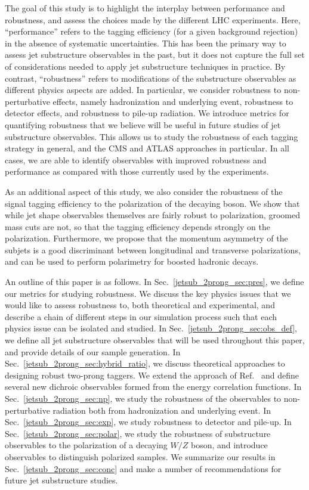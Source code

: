 \documentclass[11pt,letterpaper]{article}
\begin{document}
The goal of this study is to highlight the interplay between performance and robustness, and assess the choices made by the different LHC experiments.
%
Here, ``performance'' refers to the tagging efficiency (for a given background rejection) in the absence of systematic uncertainties.
%
This has been the primary way to assess jet substructure observables in the past, but it does not capture the full set of considerations needed to apply jet substructure techniques in practice.
%
By contrast, ``robustness'' refers to modifications of the substructure observables as different physics aspects are added.
%
In particular, we consider robustness to non-perturbative effects, namely hadronization and underlying event, robustness to detector effects, and robustness to pile-up radiation.
%
We introduce metrics for quantifying robustness that we believe will be useful in future studies of jet substructure observables.
%
This allows us to study the robustness of each tagging strategy in general, and the CMS and ATLAS approaches in particular.
%
In all cases, we are able to identify observables with improved robustness and performance as compared with those currently used by the experiments.
%
%


As an additional aspect of this study, we also consider the robustness of the signal tagging efficiency to the polarization of the decaying boson. We show that while jet shape observables themselves are fairly robust to polarization, groomed mass cuts are not, so that the tagging efficiency depends strongly on the polarization. Furthermore, we propose that the momentum  asymmetry of the subjets is a good discriminant between longitudinal and transverse polarizations, and can be used to perform polarimetry for boosted hadronic decays. 







An outline of this paper is as follows.
%
In Sec.~\ref{jetsub_2prong_sec:pres}, we define our metrics for studying robustness.
%
We discuss the key physics issues that we would like to assess robustness to, both theoretical and experimental, and describe a chain of different steps in our simulation process such that each physics issue can be isolated and studied.
%
In Sec.~\ref{jetsub_2prong_sec:obs_def}, we define all jet substructure observables that will be used throughout this paper, and  provide details of our sample generation.
%
In Sec.~\ref{jetsub_2prong_sec:hybrid_ratio}, we discuss theoretical approaches to designing robust two-prong taggers.
%
We extend the approach of Ref.~\cite{Salam:2016yht} and define several new dichroic observables formed from the energy correlation functions.  
%
In Sec.~\ref{jetsub_2prong_sec:np}, we study the robustness of the observables to non-perturbative radiation both from hadronization and underlying event.
%
In Sec.~\ref{jetsub_2prong_sec:exp}, we study robustness to detector and pile-up.
%
In Sec.~\ref{jetsub_2prong_sec:polar}, we study the robustness of substructure observables to the polarization of a decaying $W/Z$ boson, and introduce observables to distinguish polarized samples.
%
We summarize our results in Sec.~\ref{jetsub_2prong_sec:conc} and make a number of recommendations for future jet substructure studies.
\end{document}
